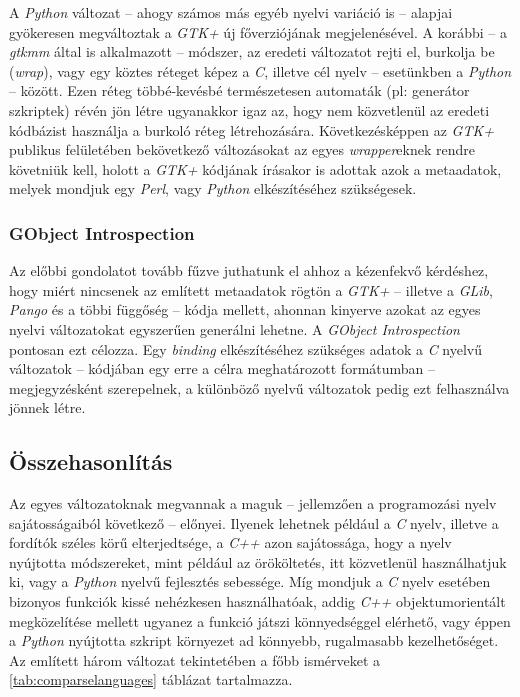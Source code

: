 A \textit{Python} változat -- ahogy számos más egyéb nyelvi variáció is -- alapjai gyökeresen megváltoztak a \textit{GTK+} új főverziójának megjelenésével. A korábbi -- a \textit{gtkmm} által is alkalmazott -- módszer, az eredeti változatot rejti el, burkolja be (\textit{wrap}), vagy egy köztes réteget képez a \textit{C}, illetve cél nyelv -- esetünkben a \textit{Python} -- között. Ezen réteg többé-kevésbé természetesen automaták (pl: generátor szkriptek) révén jön létre ugyanakkor igaz az, hogy nem közvetlenül az eredeti kódbázist használja a burkoló réteg létrehozására. Következésképpen az \textit{GTK+} publikus felületében bekövetkező változásokat az egyes \textit{wrapper}eknek rendre követniük kell, holott a \textit{GTK+} kódjának írásakor is adottak azok a metaadatok, melyek mondjuk egy \textit{Perl}, vagy \textit{Python} elkészítéséhez szükségesek.

\subsubsection{GObject Introspection}

Az előbbi gondolatot tovább fűzve juthatunk el ahhoz a kézenfekvő kérdéshez, hogy miért nincsenek az említett metaadatok rögtön a \textit{GTK+} -- illetve a \textit{GLib}, \textit{Pango} és a többi függőség -- kódja mellett, ahonnan kinyerve azokat az egyes nyelvi változatokat egyszerűen generálni lehetne. A \textit{GObject Introspection} pontosan ezt célozza. Egy \textit{binding} elkészítéséhez szükséges adatok a \textit{C} nyelvű változatok -- kódjában egy erre a célra meghatározott formátumban -- megjegyzésként szerepelnek, a különböző nyelvű változatok pedig ezt felhasználva jönnek létre.

\subsection{Összehasonlítás}

Az egyes változatoknak megvannak a maguk -- jellemzően a programozási nyelv sajátosságaiból következő -- előnyei. Ilyenek lehetnek például a \textit{C} nyelv, illetve a fordítók széles körű elterjedtsége, a \textit{C++} azon sajátossága, hogy a nyelv nyújtotta módszereket, mint például az örököltetés, itt közvetlenül használhatjuk ki, vagy a \textit{Python} nyelvű fejlesztés sebessége. Míg mondjuk a \textit{C} nyelv esetében bizonyos funkciók kissé nehézkesen használhatóak, addig \textit{C++} objektumorientált megközelítése mellett ugyanez a funkció játszi könnyedséggel elérhető, vagy éppen a \textit{Python} nyújtotta szkript környezet ad könnyebb, rugalmasabb kezelhetőséget. Az említett három változat tekintetében a főbb ismérveket a \ref{tab:comparselanguages} táblázat tartalmazza.

